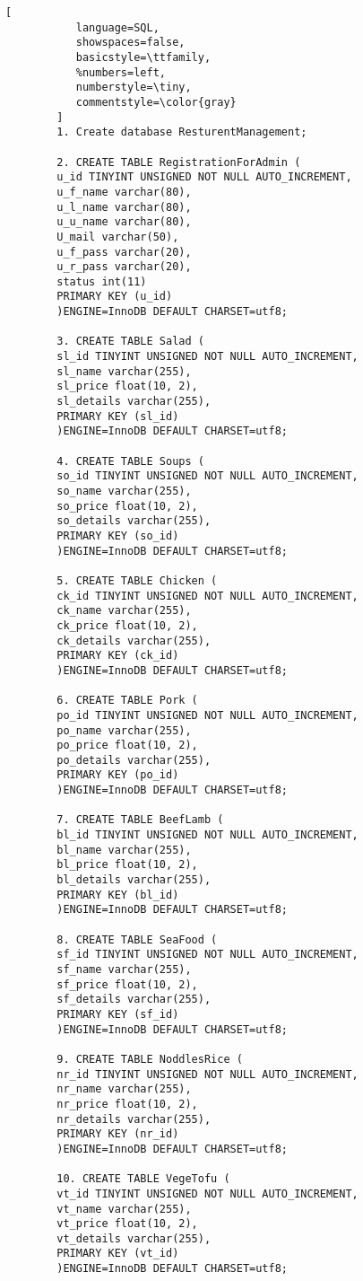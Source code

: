 \documentclass[12pt,a4paper]{article}
\begin{document}
	\begin{lstlisting}[
           language=SQL,
           showspaces=false,
           basicstyle=\ttfamily,
           %numbers=left,
           numberstyle=\tiny,
           commentstyle=\color{gray}
        ]
		1. Create database ResturentManagement;
		
		2. CREATE TABLE RegistrationForAdmin (
		u_id TINYINT UNSIGNED NOT NULL AUTO_INCREMENT,
		u_f_name varchar(80),
		u_l_name varchar(80),
		u_u_name varchar(80),
		U_mail varchar(50),
		u_f_pass varchar(20),
		u_r_pass varchar(20),
		status int(11)
		PRIMARY KEY (u_id)
		)ENGINE=InnoDB DEFAULT CHARSET=utf8;
		
		3. CREATE TABLE Salad (
		sl_id TINYINT UNSIGNED NOT NULL AUTO_INCREMENT,
		sl_name varchar(255),
		sl_price float(10, 2),
		sl_details varchar(255),
		PRIMARY KEY (sl_id)
		)ENGINE=InnoDB DEFAULT CHARSET=utf8;

 		4. CREATE TABLE Soups (
		so_id TINYINT UNSIGNED NOT NULL AUTO_INCREMENT,
		so_name varchar(255),
		so_price float(10, 2),
		so_details varchar(255),
		PRIMARY KEY (so_id)
		)ENGINE=InnoDB DEFAULT CHARSET=utf8;

  		5. CREATE TABLE Chicken (
		ck_id TINYINT UNSIGNED NOT NULL AUTO_INCREMENT,
		ck_name varchar(255),
		ck_price float(10, 2),
		ck_details varchar(255),
		PRIMARY KEY (ck_id)
		)ENGINE=InnoDB DEFAULT CHARSET=utf8;

		6. CREATE TABLE Pork (
		po_id TINYINT UNSIGNED NOT NULL AUTO_INCREMENT,
		po_name varchar(255),
		po_price float(10, 2),
		po_details varchar(255),
		PRIMARY KEY (po_id)
		)ENGINE=InnoDB DEFAULT CHARSET=utf8;

	 	7. CREATE TABLE BeefLamb (
		bl_id TINYINT UNSIGNED NOT NULL AUTO_INCREMENT,
		bl_name varchar(255),
		bl_price float(10, 2),
		bl_details varchar(255),
		PRIMARY KEY (bl_id)
		)ENGINE=InnoDB DEFAULT CHARSET=utf8;

		8. CREATE TABLE SeaFood (
		sf_id TINYINT UNSIGNED NOT NULL AUTO_INCREMENT,
		sf_name varchar(255),
		sf_price float(10, 2),
		sf_details varchar(255),
		PRIMARY KEY (sf_id)
		)ENGINE=InnoDB DEFAULT CHARSET=utf8;

	 	9. CREATE TABLE NoddlesRice (
		nr_id TINYINT UNSIGNED NOT NULL AUTO_INCREMENT,
		nr_name varchar(255),
		nr_price float(10, 2),
		nr_details varchar(255),
		PRIMARY KEY (nr_id)
		)ENGINE=InnoDB DEFAULT CHARSET=utf8;

	 	10. CREATE TABLE VegeTofu (
		vt_id TINYINT UNSIGNED NOT NULL AUTO_INCREMENT,
		vt_name varchar(255),
		vt_price float(10, 2),
		vt_details varchar(255),
		PRIMARY KEY (vt_id)
		)ENGINE=InnoDB DEFAULT CHARSET=utf8;


\end{lstlisting}
\end{document}
